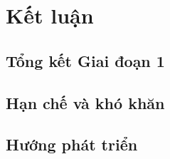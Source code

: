 \chapter{Kết luận}
    \section{Tổng kết Giai đoạn 1}
    \section{Hạn chế và khó khăn}
    \section{Hướng phát triển}
